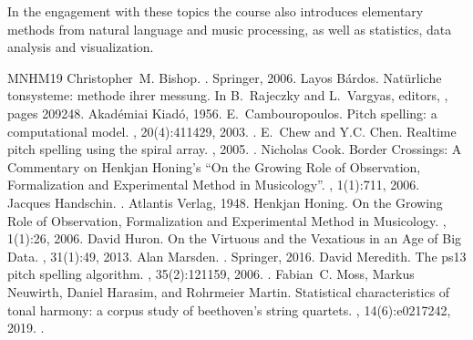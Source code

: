 \documentclass[letterpaper,10pt,english]{sphinxmanual}
\begin{document}
In the engagement with these topics the course also introduces elementary methods from natural language and music processing,
as well as statistics, data analysis and visualization.

\begin{sphinxthebibliography}{MNHM19}
Christopher M. Bishop. . Springer, 2006.
Layos Bárdos. Natürliche tonsysteme: methode ihrer messung. In B. Rajeczky and L. Vargyas, editors, , pages 209\textendash{}\textendash{}248. Akadémiai Kiadó, 1956.
E. Cambouropoulos. Pitch spelling: a computational model. , 20(4):411\textendash{}429, 2003. .
E. Chew and Y.\sphinxhyphen{}C. Chen. Real\sphinxhyphen{}time pitch spelling using the spiral array. , 2005. .
Nicholas Cook. Border Crossings: A Commentary on Henkjan Honing’s “On the Growing Role of Observation, Formalization and Experimental Method in Musicology”. , 1(1):7\textendash{}11, 2006.
Jacques Handschin. . Atlantis Verlag, 1948.
Henkjan Honing. On the Growing Role of Observation, Formalization and Experimental Method in Musicology. , 1(1):2\textendash{}6, 2006.
David Huron. On the Virtuous and the Vexatious in an Age of Big Data. , 31(1):4\textendash{}9, 2013.
Alan Marsden. . Springer, 2016.
David Meredith. The ps13 pitch spelling algorithm. , 35(2):121\textendash{}159, 2006. .
Fabian C. Moss, Markus Neuwirth, Daniel Harasim, and Rohrmeier Martin. Statistical characteristics of tonal harmony: a corpus study of beethoven’s string quartets. , 14(6):e0217242, 2019. .

\end{sphinxthebibliography}
\end{document}
